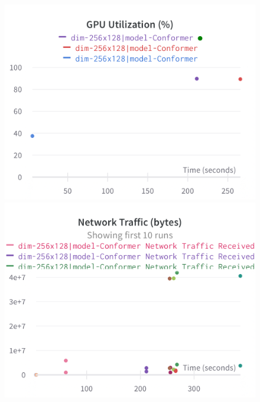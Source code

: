 \documentclass{article}
\begin{document}
\begin{figure}[!htb]
\includegraphics[width=\linewidth]{charts/Section-4-Panel-4-n5xzc0cpy}
\caption{}
\endminipage\hfill
{}
\includegraphics[width=\linewidth]{charts/Section-4-Panel-5-6pzbstsjq}
\caption{}
\endminipage
\end{figure}

\nocite{*}


\end{document}
